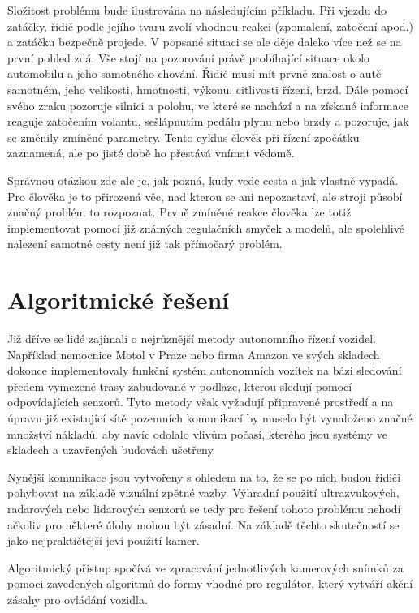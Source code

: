 \documentclass[czech, bc, kky, he, iso690numb]{fasthesis}
\begin{document}
        Složitost problému bude ilustrována na následujícím příkladu. Při vjezdu do zatáčky, řidič podle jejího tvaru zvolí vhodnou reakci (zpomalení, zatočení apod.) a zatáčku bezpečně projede. V popsané situaci se ale děje daleko více než se na první pohled zdá. Vše stojí na pozorování právě probíhající situace okolo automobilu a jeho samotného chování. Řidič musí mít prvně znalost o autě samotném, jeho velikosti, hmotnosti, výkonu, citlivosti řízení, brzd. Dále pomocí svého zraku pozoruje silnici a polohu, ve které se nachází a na získané informace reaguje zatočením volantu, sešlápnutím pedálu plynu nebo brzdy a pozoruje, jak se změnily zmíněné parametry. Tento cyklus člověk při řízení zpočátku zaznamená, ale po jisté době ho přestává vnímat vědomě.
        
        Správnou otázkou zde ale je, jak pozná, kudy vede cesta a jak vlastně vypadá. Pro člověka je to přirozená věc, nad kterou se ani nepozastaví, ale stroji působí značný problém to rozpoznat. Prvně zmíněné reakce člověka lze totiž implementovat pomocí již známých regulačních smyček a modelů, ale spolehlivé nalezení samotné cesty není již tak přímočarý problém.
        
        \section{Algoritmické řešení}
            Již dříve se lidé zajímali o nejrůznější metody autonomního řízení vozidel. Například nemocnice Motol v Praze nebo firma Amazon ve svých skladech dokonce implementovaly funkční systém autonomních vozítek na bázi sledování předem vymezené trasy zabudované v podlaze, kterou sledují pomocí odpovídajících senzorů. Tyto metody však vyžadují připravené prostředí a na úpravu již existující sítě pozemních komunikací by muselo být vynaloženo značné množství nákladů, aby navíc odolalo vlivům počasí, kterého jsou systémy ve skladech a uzavřených budovách ušetřeny.
            
            Nynější komunikace jsou vytvořeny s ohledem na to, že se po nich budou řidiči pohybovat na základě vizuální zpětné vazby. Výhradní použití ultrazvukových, radarových nebo lidarových senzorů se tedy pro řešení tohoto problému nehodí ačkoliv pro některé úlohy mohou být zásadní. Na základě těchto skutečností se jako nejpraktičtější jeví použití kamer.
            
            Algoritmický přístup spočívá ve zpracování jednotlivých kamerových snímků za pomoci zavedených algoritmů do formy vhodné pro regulátor, který vytváří akční zásahy pro ovládání vozidla.
            
\end{document}
